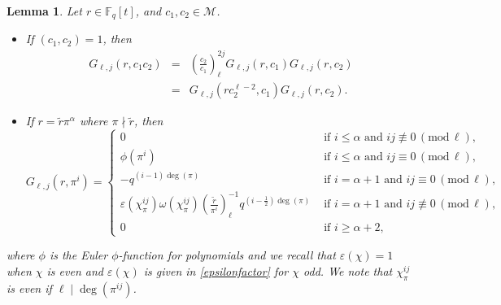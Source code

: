 \documentclass[12pt]{amsart}
\newtheorem{lemma}[theorem]{Lemma}
\newcommand{\F}{\mathbb{F}}
\renewcommand{\pmod}[1]{\,(\mathrm{mod}\,#1)}
\def\cM{\mathcal{M}}
\newcommand{\legl}[2]{\left( \frac{#1}{#2} \right)_\ell}
\begin{document}
\begin{lemma} \label{gauss}
Let $r \in \F_q[t]$, and $c_1, c_2 \in \cM$.
\begin{itemize}
 \item[(i)] If $(c_1 ,c_2)=1$, then 
\begin{eqnarray*} G_{\ell,j}(r,{c_1 c_2}) 
&=& \legl{c_2}{c_1}^{2j} G_{\ell,j}(r, c_1 )G_{\ell,j}(r, {c_2}) \\
&=& G_{\ell,j}(rc_2^{\ell-2}, c_1) G_{\ell,j}(r,c_2). \end{eqnarray*}
\item[(ii)] If $r=\tilde{r} \pi^\alpha$ where $\pi \nmid \tilde{r}$, then
\[G_{\ell,j}(r, \pi^i) = \left\{\begin{array}{ll}
0 & \mbox{ if }i \leq \alpha \mbox{ and } ij \not \equiv 0 \pmod{\ell},\\
                      \phi(\pi^{i})& \mbox{ if }i \leq \alpha \mbox{ and } ij \equiv 0 \pmod{\ell},\\
                        -q^{(i-1)\deg(\pi) }&\mbox{ if }i=\alpha+1 \mbox{ and } ij \equiv 0 \pmod{\ell},\\
                       \varepsilon(\chi_\pi^{ij})  \omega(\chi_\pi^{ij}) \legl{\tilde{r}}{\pi^i}^{-1}  q^{(i-\frac{1}{2})\deg(\pi) } &\mbox{ if }i=\alpha+1 \mbox{ and }  ij \not \equiv 0 \pmod{\ell},\\
                                               0 & \mbox{ if }i \geq \alpha+2,
                         \end{array}
 \right.
\]
\end{itemize}
where $\phi$ is the Euler $\phi$-function for polynomials and we recall that $\varepsilon(\chi)=1$ when $\chi$ is even and $\varepsilon(\chi)$ is given in \eqref{epsilonfactor} for $\chi$ odd. We note that $\chi_{\pi}^{ij}$ is even if $\ell \mid \deg(\pi^{ij})$.  \end{lemma}
\end{document}
